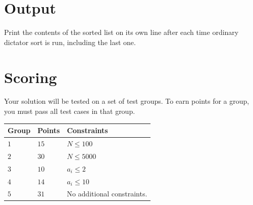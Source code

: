 \section*{Output}
Print the contents of the sorted list on its own line after each time ordinary dictator sort is run,
including the last one.

\section*{Scoring}
Your solution will be tested on a set of test groups.
To earn points for a group, you must pass all test cases in that group.

\noindent
\begin{tabular}{| l | l | p{12cm} |}
  \hline
  \textbf{Group} & \textbf{Points} & \textbf{Constraints} \\ \hline
  $1$    & $15$   & $N \leq 100$ \\ \hline
  $2$    & $30$   & $N \leq 5000$ \\ \hline
  $3$    & $10$   & $a_i \leq 2$ \\ \hline
  $4$    & $14$   & $a_i \leq 10$ \\ \hline
  $5$    & $31$   & No additional constraints. \\ \hline
\end{tabular}

